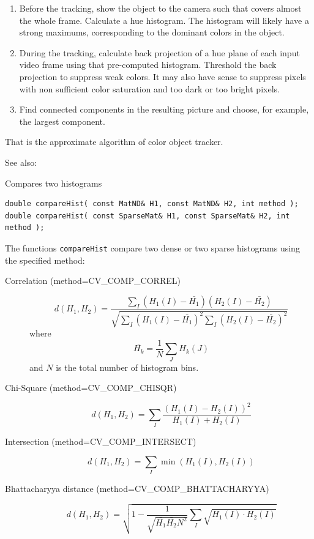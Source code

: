 \begin{enumerate}
 \item Before the tracking, show the object to the camera such that covers almost the whole frame. Calculate a hue histogram. The histogram will likely have a strong maximums, corresponding to the dominant colors in the object.
 \item During the tracking, calculate back projection of a hue plane of each input video frame using that pre-computed histogram. Threshold the back projection to suppress weak colors. It may also have sense to suppress pixels with non sufficient color saturation and too dark or too bright pixels.
 \item Find connected components in the resulting picture and choose, for example, the largest component.
\end{enumerate}

That is the approximate algorithm of  color object tracker.

See also: 

\label{compareHist}
Compares two histograms

\begin{lstlisting}
double compareHist( const MatND& H1, const MatND& H2, int method );
double compareHist( const SparseMat& H1, const SparseMat& H2, int method );
\end{lstlisting}
\begin{description}
\end{description}

The functions \texttt{compareHist} compare two dense or two sparse histograms using the specified method:

\begin{description}
\item[Correlation (method=CV\_COMP\_CORREL)]
\[
d(H_1,H_2) = \frac
{\sum_I (H_1(I) - \bar{H_1}) (H_2(I) - \bar{H_2})}
{\sqrt{\sum_I(H_1(I) - \bar{H_1})^2 \sum_I(H_2(I) - \bar{H_2})^2}}
\]
where
\[
\bar{H_k} = \frac{1}{N} \sum_J H_k(J)
\]
and $N$ is the total number of histogram bins.

\item[Chi-Square (method=CV\_COMP\_CHISQR)]
\[ d(H_1,H_2) = \sum_I \frac{\left(H_1(I)-H_2(I)\right)^2}{H_1(I)+H_2(I)} \]

\item[Intersection (method=CV\_COMP\_INTERSECT)]
\[ d(H_1,H_2) = \sum_I \min (H_1(I), H_2(I)) \]

\item[Bhattacharyya distance (method=CV\_COMP\_BHATTACHARYYA)]
\[ d(H_1,H_2) = \sqrt{1 - \frac{1}{\sqrt{\bar{H_1} \bar{H_2} N^2}} \sum_I \sqrt{H_1(I) \cdot H_2(I)}} \]

\end{description}

